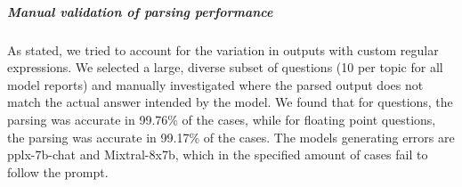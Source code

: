 \subparagraph*{Manual validation of parsing performance}

As stated, we tried to account for the variation in outputs with custom regular expressions.
We selected a large, diverse subset of questions (10 per topic for all model reports) and manually investigated where the parsed output does not match the actual answer intended by the model.
We found that for  questions, the parsing was accurate in 99.76\% of the cases, while for floating point questions, the parsing was accurate in 99.17\% of the cases.
The models generating errors are pplx-7b-chat and Mixtral-8x7b, which in the specified amount of cases fail to follow the prompt.
